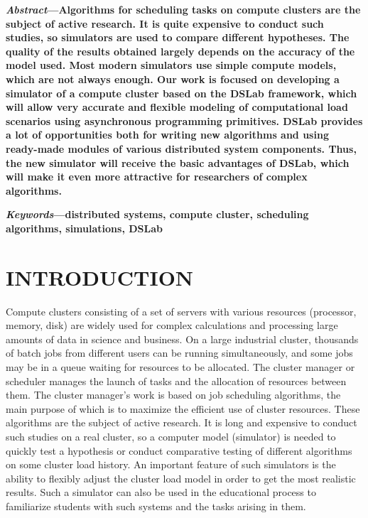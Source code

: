 \documentclass[a4paper,10pt]{article}
\begin{document}
\begin{multicols*}{2}
    
\textbf{\textit{Abstract}---Algorithms for scheduling tasks on compute clusters are the subject of active research. It is quite expensive to conduct such studies, so simulators are used to compare different hypotheses. The quality of the results obtained largely depends on the accuracy of the model used. Most modern simulators use simple compute models, which are not always enough. Our work is focused on developing a simulator of a compute cluster based on the DSLab framework, which will allow very accurate and flexible modeling of computational load scenarios using asynchronous programming primitives. DSLab provides a lot of opportunities both for writing new algorithms and using ready-made modules of various distributed system components. Thus, the new simulator will receive the basic advantages of DSLab, which will make it even more attractive for researchers of complex algorithms.}

\textbf{\textit{Keywords}---distributed systems, compute cluster, scheduling algorithms, simulations, DSLab }


\section{{\normalsize I}NTRODUCTION}

Compute clusters consisting of a set of servers with various resources (processor, memory, disk) are widely used for complex calculations and processing large amounts of data in science and business. On a large industrial cluster, thousands of batch jobs from different users can be running simultaneously, and some jobs may be in a queue waiting for resources to be allocated. The cluster manager or scheduler manages the launch of tasks and the allocation of resources between them. The cluster manager's work is based on job scheduling algorithms, the main purpose of which is to maximize the efficient use of cluster resources. These algorithms are the subject of active research. It is long and expensive to conduct such studies on a real cluster, so a computer model (simulator) is needed to quickly test a hypothesis or conduct comparative testing of different algorithms on some cluster load history. An important feature of such simulators is the ability to flexibly adjust the cluster load model in order to get the most realistic results. Such a simulator can also be used in the educational process to familiarize students with such systems and the tasks arising in them. 


\end{multicols*}
\end{document}
